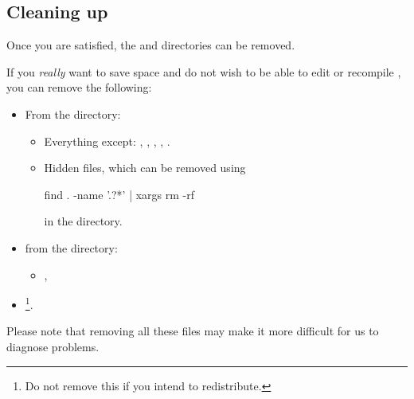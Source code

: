 \subsection{Cleaning up}
Once you are satisfied, the  and  directories can be removed.

If you \emph{really} want to save space and do not wish to be able to edit or recompile \esfinley, you can remove the following:
\begin{itemize}
 \item From the  directory:\begin{itemize}
\item Everything except: , , , ,
.
\item Hidden files, which can be removed using
\begin{shellCode}
find . -name '.?*' | xargs rm -rf
\end{shellCode}
in the  directory.
\end{itemize}
\item from the  directory:
\begin{itemize}
\item  {}, 
\end{itemize}
\item {}\footnote{Do not remove this if you intend to redistribute.}.
\end{itemize}

Please note that removing all these files may make it more difficult for us to diagnose problems.


